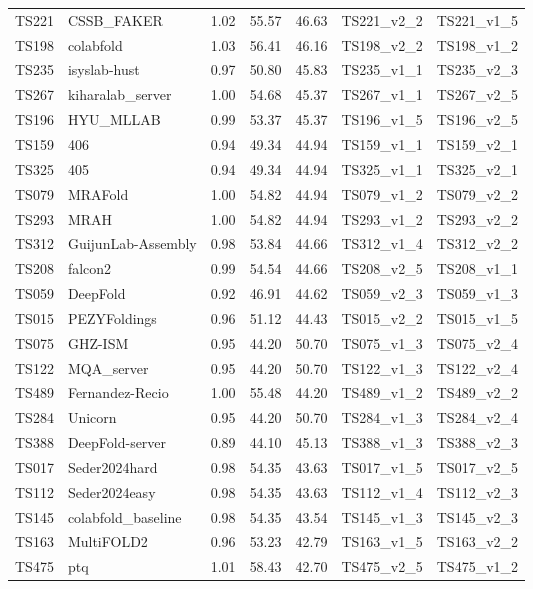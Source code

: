 \begin{longtable}{lllllll}
TS221 & CSSB\_FAKER & 1.02 & 55.57 & 46.63 & TS221\_v2\_2 & TS221\_v1\_5 \\ 
TS198 & colabfold & 1.03 & 56.41 & 46.16 & TS198\_v2\_2 & TS198\_v1\_2 \\ 
TS235 & isyslab-hust & 0.97 & 50.80 & 45.83 & TS235\_v1\_1 & TS235\_v2\_3 \\ 
TS267 & kiharalab\_server & 1.00 & 54.68 & 45.37 & TS267\_v1\_1 & TS267\_v2\_5 \\ 
TS196 & HYU\_MLLAB & 0.99 & 53.37 & 45.37 & TS196\_v1\_5 & TS196\_v2\_5 \\ 
TS159 & 406 & 0.94 & 49.34 & 44.94 & TS159\_v1\_1 & TS159\_v2\_1 \\ 
TS325 & 405 & 0.94 & 49.34 & 44.94 & TS325\_v1\_1 & TS325\_v2\_1 \\ 
TS079 & MRAFold & 1.00 & 54.82 & 44.94 & TS079\_v1\_2 & TS079\_v2\_2 \\ 
TS293 & MRAH & 1.00 & 54.82 & 44.94 & TS293\_v1\_2 & TS293\_v2\_2 \\ 
TS312 & GuijunLab-Assembly & 0.98 & 53.84 & 44.66 & TS312\_v1\_4 & TS312\_v2\_2 \\ 
TS208 & falcon2 & 0.99 & 54.54 & 44.66 & TS208\_v2\_5 & TS208\_v1\_1 \\ 
TS059 & DeepFold & 0.92 & 46.91 & 44.62 & TS059\_v2\_3 & TS059\_v1\_3 \\ 
TS015 & PEZYFoldings & 0.96 & 51.12 & 44.43 & TS015\_v2\_2 & TS015\_v1\_5 \\ 
TS075 & GHZ-ISM & 0.95 & 44.20 & 50.70 & TS075\_v1\_3 & TS075\_v2\_4 \\ 
TS122 & MQA\_server & 0.95 & 44.20 & 50.70 & TS122\_v1\_3 & TS122\_v2\_4 \\ 
TS489 & Fernandez-Recio & 1.00 & 55.48 & 44.20 & TS489\_v1\_2 & TS489\_v2\_2 \\ 
TS284 & Unicorn & 0.95 & 44.20 & 50.70 & TS284\_v1\_3 & TS284\_v2\_4 \\ 
TS388 & DeepFold-server & 0.89 & 44.10 & 45.13 & TS388\_v1\_3 & TS388\_v2\_3 \\ 
TS017 & Seder2024hard & 0.98 & 54.35 & 43.63 & TS017\_v1\_5 & TS017\_v2\_5 \\ 
TS112 & Seder2024easy & 0.98 & 54.35 & 43.63 & TS112\_v1\_4 & TS112\_v2\_3 \\ 
TS145 & colabfold\_baseline & 0.98 & 54.35 & 43.54 & TS145\_v1\_3 & TS145\_v2\_3 \\ 
TS163 & MultiFOLD2 & 0.96 & 53.23 & 42.79 & TS163\_v1\_5 & TS163\_v2\_2 \\ 
TS475 & ptq & 1.01 & 58.43 & 42.70 & TS475\_v2\_5 & TS475\_v1\_2 \\ 

\end{longtable}
